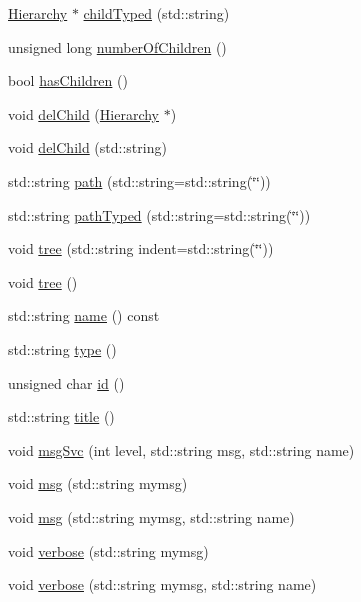 \begin{DoxyCompactItemize}
\item 
\hyperlink{classHierarchy}{Hierarchy} $\ast$ \hyperlink{classHierarchy_a0c15a5276a3b80b4354d6bd8a01e0708}{childTyped} (std::string)
\item 
unsigned long \hyperlink{classHierarchy_ab16e84de65fd84e14001a6cf941c8be4}{numberOfChildren} ()
\item 
bool \hyperlink{classHierarchy_a255174fe4d316d2a3f430dcb9dab29f1}{hasChildren} ()
\item 
void \hyperlink{classHierarchy_a2b2b359fac003233f65786a616766bde}{delChild} (\hyperlink{classHierarchy}{Hierarchy} $\ast$)
\item 
void \hyperlink{classHierarchy_a1928ac7615fe0b5e55cd707f70dc6781}{delChild} (std::string)
\item 
std::string \hyperlink{classHierarchy_aa7990fa7caf132d83e361ce033c6c65a}{path} (std::string=std::string(\char`\"{}\char`\"{}))
\item 
std::string \hyperlink{classHierarchy_a1efd56cd164d328d2002e53a10a19b8c}{pathTyped} (std::string=std::string(\char`\"{}\char`\"{}))
\item 
void \hyperlink{classHierarchy_a76e914b9a677a22a82deb74d892bf261}{tree} (std::string indent=std::string(\char`\"{}\char`\"{}))
\item 
void \hyperlink{classHierarchy_a594c294c5f60c230e106d522ed008212}{tree} ()
\item 
std::string \hyperlink{classObject_a975e888d50bfcbffda2c86368332a5cd}{name} () const 
\item 
std::string \hyperlink{classObject_a84f99f70f144a83e1582d1d0f84e4e62}{type} ()
\item 
unsigned char \hyperlink{classObject_af99145335cc61ff6e2798ea17db009d2}{id} ()
\item 
std::string \hyperlink{classObject_a73a0f1a41828fdd8303dd662446fb6c3}{title} ()
\item 
void \hyperlink{classObject_a3f9d5537ebce0c0f2bf6ae4d92426f3c}{msgSvc} (int level, std::string msg, std::string name)
\item 
void \hyperlink{classObject_a58b2d0618c2d08cf2383012611528d97}{msg} (std::string mymsg)
\item 
void \hyperlink{classObject_ac5d59299273cee27aacf7de00d2e7034}{msg} (std::string mymsg, std::string name)
\item 
void \hyperlink{classObject_a83d2db2df682907ea1115ad721c1c4a1}{verbose} (std::string mymsg)
\item 
void \hyperlink{classObject_a2d4120195317e2a3c6532e8bb9f3da68}{verbose} (std::string mymsg, std::string name)

\end{DoxyCompactItemize}
